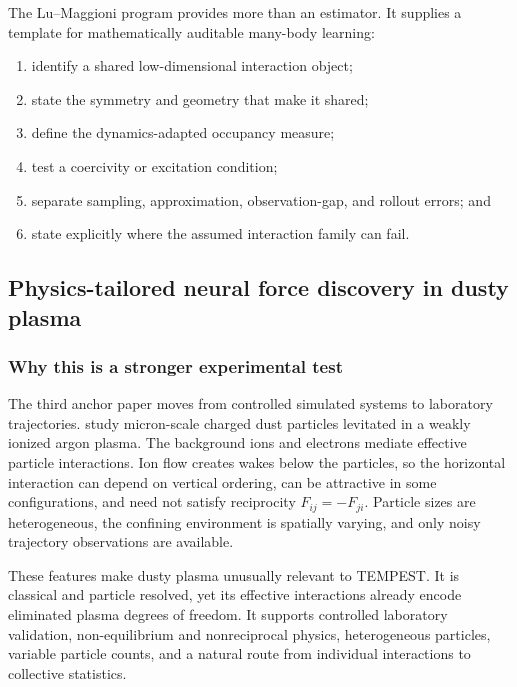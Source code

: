 \begin{takeaway}
The Lu--Maggioni program provides more than an estimator. It supplies a template for mathematically auditable many-body learning:
\begin{enumerate}
  \item identify a shared low-dimensional interaction object;
  \item state the symmetry and geometry that make it shared;
  \item define the dynamics-adapted occupancy measure;
  \item test a coercivity or excitation condition;
  \item separate sampling, approximation, observation-gap, and rollout errors; and
  \item state explicitly where the assumed interaction family can fail.
\end{enumerate}
\end{takeaway}

\subsection{Physics-tailored neural force discovery in dusty plasma}

\subsubsection{Why this is a stronger experimental test}

The third anchor paper moves from controlled simulated systems to laboratory trajectories. \citet{yu2025dusty} study micron-scale charged dust particles levitated in a weakly ionized argon plasma. The background ions and electrons mediate effective particle interactions. Ion flow creates wakes below the particles, so the horizontal interaction can depend on vertical ordering, can be attractive in some configurations, and need not satisfy reciprocity \(F_{ij}=-F_{ji}\). Particle sizes are heterogeneous, the confining environment is spatially varying, and only noisy trajectory observations are available.

These features make dusty plasma unusually relevant to TEMPEST. It is classical and particle resolved, yet its effective interactions already encode eliminated plasma degrees of freedom. It supports controlled laboratory validation, non-equilibrium and nonreciprocal physics, heterogeneous particles, variable particle counts, and a natural route from individual interactions to collective statistics.

